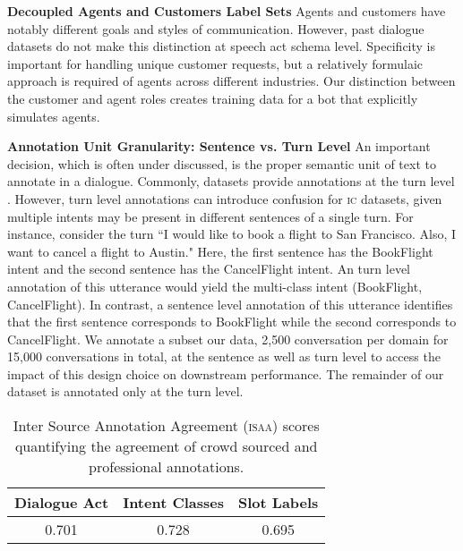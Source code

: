 {{	\textbf{Decoupled Agents and Customers Label Sets}
	Agents and customers have notably different goals and styles of communication.  However, past dialogue datasets do not make this distinction at speech act schema level. Specificity is important for handling unique customer requests, but a relatively formulaic approach is required of agents across different industries.  Our distinction between the customer and agent roles creates training data for a bot that explicitly simulates agents. 
	
	\textbf{Annotation Unit Granularity: Sentence vs. Turn Level}
	An important decision, which is often under discussed, is the proper semantic unit of text to annotate in a dialogue.
	Commonly, datasets provide annotations at the turn level \citep{budzianowski2018multiwoz, asri2017frames, kvret}. 
	However, turn level annotations can introduce confusion for \textsc{ic} datasets, given multiple intents may be present in different sentences of a single turn. 
	For instance, consider the turn ``I would like to book a flight to San Francisco. Also, I want to cancel a flight to Austin."
	Here, the first sentence has the BookFlight intent and the second sentence has the CancelFlight intent. 
	An turn level annotation of this utterance would yield the multi-class intent (BookFlight, CancelFlight). 
	In contrast, a sentence level annotation of this utterance identifies that the first sentence corresponds to BookFlight while the second corresponds to CancelFlight.
	We annotate a subset our data, 2,500 conversation per domain for 15,000 conversations in total, at the sentence as well as turn level to access the impact of this design choice on downstream performance. The remainder of our dataset is annotated only at the turn level. %
	
	
	\begin{table}[t!]
		\small
		\centering
		\begin{tabular}{c  c  c }
			\textbf{Dialogue Act} &\textbf{ Intent Classes}& \textbf{Slot Labels} \\
			\hline
			0.701 & 0.728 & 0.695 \\
			\hline
		\end{tabular}
		\caption{Inter Source Annotation Agreement (\textsc{isaa}) scores quantifying the agreement of crowd sourced and professional annotations.}
		\label{ipa}
	\end{table}
	
}}
